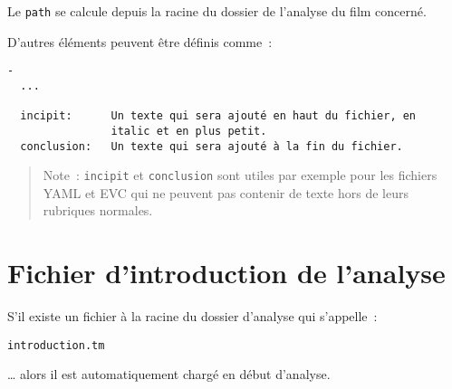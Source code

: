 Le \texttt{path} se calcule depuis la racine du dossier de l'analyse du film concerné.

D'autres éléments peuvent être définis comme~{}:

\begin{verbatim}-
  ...
  
  incipit:      Un texte qui sera ajouté en haut du fichier, en 
                italic et en plus petit.
  conclusion:   Un texte qui sera ajouté à la fin du fichier.
\end{verbatim}

\begin{quote}
Note~{}: \texttt{incipit} et \texttt{conclusion} sont utiles par exemple pour les fichiers YAML et EVC qui ne peuvent pas contenir de texte hors de leurs rubriques normales.
\end{quote}



\section{Fichier d'introduction de l'analyse}\hypertarget{fichier-dintroduction-de-lanalyse}{}\label{fichier-dintroduction-de-lanalyse}

S'il existe un fichier à la racine du dossier d'analyse qui s'appelle~{}:

\begin{verbatim}introduction.tm
\end{verbatim}

… alors il est automatiquement chargé en début d'analyse.

